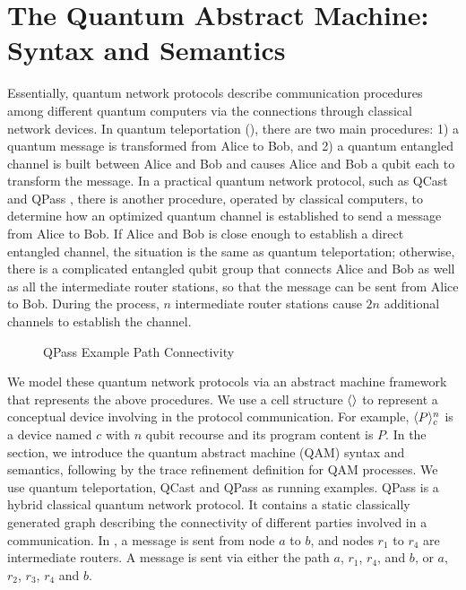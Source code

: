 \section{The Quantum Abstract Machine:  Syntax and Semantics} \label{sec:qam}

Essentially, quantum network protocols describe communication procedures 
among different quantum computers via the connections through classical network devices. 
In quantum teleportation (), there are two main procedures: 
1) a quantum message is transformed from Alice to Bob, 
and 2) a quantum entangled channel is built between Alice and Bob and causes Alice and Bob a qubit each to transform the message.
In a practical quantum network protocol, such as QCast and QPass \cite{10.1145/3387514.3405853}, 
there is another procedure, operated by classical computers, to determine how an optimized quantum channel is established to send a message from Alice to Bob.
If Alice and Bob is close enough to establish a direct entangled channel, the situation is the same as quantum teleportation;
otherwise, there is a complicated entangled qubit group that connects Alice and Bob as well as all the intermediate router stations,
so that the message can be sent from Alice to Bob. During the process, $n$ intermediate router stations cause $2n$ additional channels to establish the channel.

\begin{figure}[t]
{\small
\begin{center}
\end{center}
}
\caption{QPass Example Path Connectivity}
  \label{fig:q-pi-example}
\end{figure}

We model these quantum network protocols via an abstract machine framework that represents the above procedures.
We use a cell structure $\langle  \rangle$ to represent a conceptual device involving in the protocol communication.
For example, $\langle P \rangle^{n}_{c}$ is a device named $c$ with $n$ qubit recourse and its program content is $P$.
In the section, we introduce the quantum abstract machine (QAM) syntax and semantics, following by the trace refinement definition for QAM processes. We use quantum teleportation, QCast and QPass as running examples.
QPass is a hybrid classical quantum network protocol. It contains a static classically generated graph describing the connectivity of different parties involved in a communication.
In , a message is sent from node $a$ to $b$, and nodes $r_1$ to $r_4$ are intermediate routers.
A message is sent via either the path $a$, $r_1$, $r_4$, and $b$, or $a$, $r_2$, $r_3$, $r_4$ and $b$.

